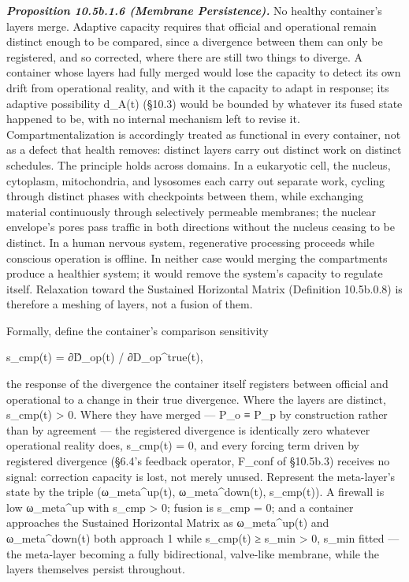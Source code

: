 \documentclass[
]{article}
\begin{document}
\emph{\textbf{Proposition 10.5b.1.6 (Membrane Persistence).}} No healthy
container's layers merge. Adaptive capacity requires that official and
operational remain distinct enough to be compared, since a divergence
between them can only be registered, and so corrected, where there are
still two things to diverge. A container whose layers had fully merged
would lose the capacity to detect its own drift from operational
reality, and with it the capacity to adapt in response; its adaptive
possibility d\_A(t) (§10.3) would be bounded by whatever its fused state
happened to be, with no internal mechanism left to revise it.
Compartmentalization is accordingly treated as functional in every
container, not as a defect that health removes: distinct layers carry
out distinct work on distinct schedules. The principle holds across
domains. In a eukaryotic cell, the nucleus, cytoplasm, mitochondria, and
lysosomes each carry out separate work, cycling through distinct phases
with checkpoints between them, while exchanging material continuously
through selectively permeable membranes; the nuclear envelope's pores
pass traffic in both directions without the nucleus ceasing to be
distinct. In a human nervous system, regenerative processing proceeds
while conscious operation is offline. In neither case would merging the
compartments produce a healthier system; it would remove the system's
capacity to regulate itself. Relaxation toward the Sustained Horizontal
Matrix (Definition 10.5b.0.8) is therefore a meshing of layers, not a
fusion of them.

Formally, define the container's comparison sensitivity

s\_cmp(t) = ∂D̂\_op(t) / ∂D\_op\^{}true(t),

the response of the divergence the container itself registers between
official and operational to a change in their true divergence. Where the
layers are distinct, s\_cmp(t) \textgreater{} 0. Where they have merged
--- P\_o ≡ P\_p by construction rather than by agreement --- the
registered divergence is identically zero whatever operational reality
does, s\_cmp(t) = 0, and every forcing term driven by registered
divergence (§6.4's feedback operator, F\_conf of §10.5b.3) receives no
signal: correction capacity is lost, not merely unused. Represent the
meta-layer's state by the triple (ω\_meta\^{}up(t), ω\_meta\^{}down(t),
s\_cmp(t)). A firewall is low ω\_meta\^{}up with s\_cmp \textgreater{}
0; fusion is s\_cmp = 0; and a container approaches the Sustained
Horizontal Matrix as ω\_meta\^{}up(t) and ω\_meta\^{}down(t) both
approach 1 while s\_cmp(t) ≥ s\_min \textgreater{} 0, s\_min fitted ---
the meta-layer becoming a fully bidirectional, valve-like membrane,
while the layers themselves persist throughout.
\end{document}
